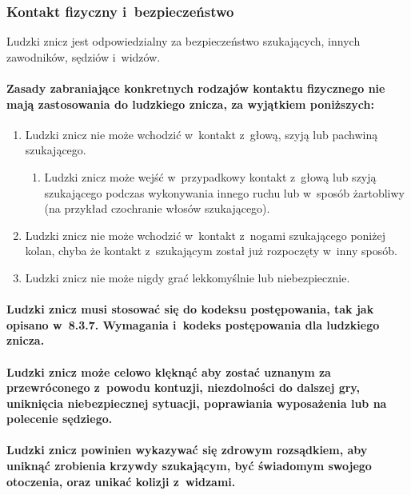 \documentclass[12pt,a4paper]{article}
\begin{document}
\subsubsection{Kontakt fizyczny i~bezpieczeństwo}

Ludzki znicz jest odpowiedzialny za bezpieczeństwo szukających, innych
zawodników, sędziów i~widzów.

\paragraph{Zasady zabraniające konkretnych rodzajów kontaktu
	fizycznego nie mają zastosowania do ludzkiego znicza, za wyjątkiem
	poniższych:}

\begin{enumerate}
	\item Ludzki znicz nie może wchodzić w~kontakt z~głową, szyją lub pachwiną
	      szukającego.
	      \begin{enumerate}
		      \item Ludzki znicz może wejść w~przypadkowy kontakt z~głową lub szyją
		            szukającego podczas wykonywania innego ruchu lub w~sposób żartobliwy (na
		            przykład czochranie włosów szukającego).
	      \end{enumerate}

	\item Ludzki znicz nie może wchodzić w~kontakt z~nogami szukającego poniżej
	      kolan, chyba że kontakt z~szukającym został już rozpoczęty w~inny
	      sposób.

	\item Ludzki znicz nie może nigdy grać lekkomyślnie lub niebezpiecznie.
\end{enumerate}

\paragraph{Ludzki znicz musi stosować się do kodeksu
	postępowania, tak jak opisano w~8.3.7. Wymagania i~kodeks postępowania
	dla ludzkiego znicza.}

\paragraph{Ludzki znicz może celowo klęknąć aby zostać uznanym za
	przewróconego z~powodu kontuzji, niezdolności do dalszej gry, uniknięcia
	niebezpiecznej sytuacji, poprawiania wyposażenia lub na polecenie
	sędziego.}

\paragraph{Ludzki znicz powinien wykazywać się zdrowym
	rozsądkiem, aby uniknąć zrobienia krzywdy szukającym, być świadomym
	swojego otoczenia, oraz unikać kolizji z~widzami.}
\end{document}
